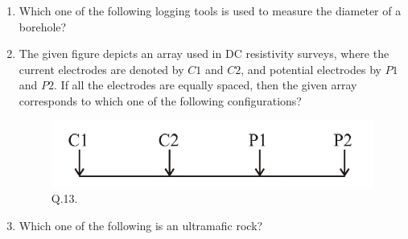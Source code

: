 \documentclass[journal,12pt,onecolumn]{IEEEtran}
\theoremstyle{remark}
\begin{document}
\begin{enumerate}
\item Which one of the following logging tools is used to measure the diameter of a borehole?
\begin{enumerate}
\end{enumerate}
\hfill{}

\item The given figure depicts an array used in DC resistivity surveys, where the current electrodes are denoted by $C1$ and $C2$, and potential electrodes by $P1$ and $P2$. If all the electrodes are equally spaced, then the given array corresponds to which one of the following configurations?
\begin{figure}[H]
    \centering
    \includegraphics[width=0.6\columnwidth]{Figs/fig_3.png}
    \caption{Q.13.}
    \label{fig:q13}
\end{figure}
\begin{enumerate}
\end{enumerate}
\hfill{}

\item Which one of the following is an ultramafic rock?
\begin{enumerate}
\end{enumerate}
\hfill{}


\end{enumerate}
\end{document}
